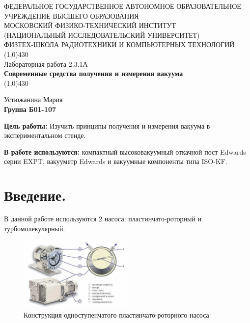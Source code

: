 \documentclass[11pt]{article}
\begin{document}
\begin{titlepage}
\begin{center}
\large{\small ФЕДЕРАЛЬНОЕ ГОСУДАРСТВЕННОЕ АВТОНОМНОЕ ОБРАЗОВАТЕЛЬНОЕ\\ УЧРЕЖДЕНИЕ ВЫСШЕГО ОБРАЗОВАНИЯ\\ МОСКОВСКИЙ ФИЗИКО-ТЕХНИЧЕСКИЙ ИНСТИТУТ\\ (НАЦИОНАЛЬНЫЙ ИССЛЕДОВАТЕЛЬСКИЙ УНИВЕРСИТЕТ)\\ ФИЗТЕХ-ШКОЛА РАДИОТЕХНИКИ И КОМПЬЮТЕРНЫХ ТЕХНОЛОГИЙ}
\vfill
\line(1,0){430}\\[1mm]
\huge{Лабораторная работа 2.3.1А}\\
\huge\textbf{Современные средства получения и измерения вакуума}\\
\line(1,0){430}\\[1mm]
\vfill
\begin{flushright}
\normalsize{Устюжанина Мария}\\
\normalsize{\textbf{Группа Б01-107}}\\
\end{flushright}
\end{center}
\end{titlepage}


\par \textbf{Цель работы:} Изучить принципы получения и измерения вакуума в экспериментальном стенде.

\par \textbf{В работе используются:} компактный высоковакуумный откачной
пост Edwards серии EXPT, вакууметр Edwards и вакуумные компоненты типа ISO-KF.

\section{Введение.}

В данной работе используются 2 насоса: пластинчато-роторный и турбомолекулярный.

\begin{figure}[H]
\centering
\captionsetup{justification=centering}
\includegraphics[width=0.5\textwidth]{Рис1.png}
\caption{Конструкция одноступенчатого пластинчато-роторного насоса}
\end{figure}
\end{document}
